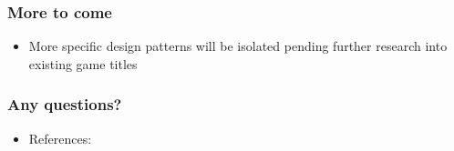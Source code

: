 \documentclass{beamer}
\begin{document}
\begin{frame}
\frametitle{More to come}
\begin{itemize}
	\item More specific design patterns will be isolated pending further research into existing game titles
\end{itemize}
\end{frame}

\begin{frame}
\frametitle{Any questions?}
\begin{itemize}
	\item References:
\end{itemize}


\end{frame}
\end{document}
